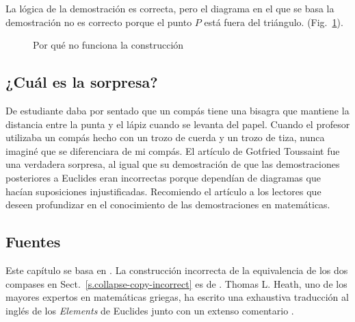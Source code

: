 La lógica de la demostración es correcta, pero el diagrama en el que se basa la demostración no es correcto porque el punto $P$ está fuera del triángulo. (Fig.~\ref{f.collapse--2}).

\begin{figure}[b]
\begin{center}
\caption{Por qué no funciona la construcción}\label{f.collapse--2}
\end{center}
\end{figure}

\subsection*{¿Cuál es la sorpresa?}

De estudiante daba por sentado que un compás tiene una bisagra que mantiene la distancia entre la punta y el lápiz cuando se levanta del papel. Cuando el profesor utilizaba un compás hecho con un trozo de cuerda y un trozo de tiza, nunca imaginé que se diferenciara de mi compás. El artículo de Gotfried Toussaint fue una verdadera sorpresa, al igual que su demostración de que las demostraciones posteriores a Euclides eran incorrectas porque dependían de diagramas que hacían suposiciones injustificadas. Recomiendo el artículo a los lectores que deseen profundizar en el conocimiento de las demostraciones en matemáticas.

\subsection*{Fuentes}

Este capítulo se basa en \cite{toussaint}. La construcción incorrecta de la equivalencia de los dos compases en Sect.~\ref{s.collapse-copy-incorrect} es de \cite{rusty}. Thomas L. Heath, uno de los mayores expertos en matemáticas griegas, ha escrito una exhaustiva traducción al inglés de los \textit{Elements} de Euclides junto con un extenso comentario \cite{euclid}.

